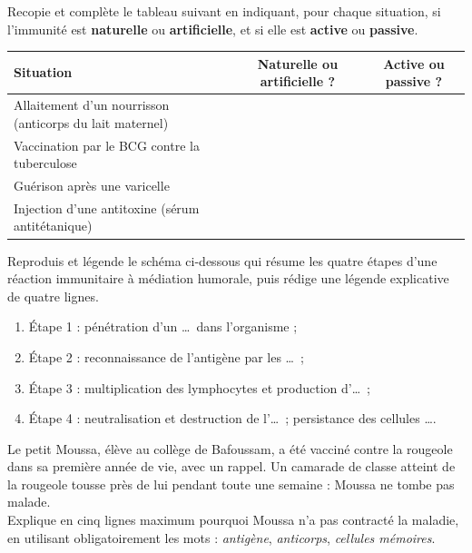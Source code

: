 \documentclass[11pt]{article}
\newcounter{popsec}
\newcounter{popsub}
\newcommand{\courssub}[1]{%
  \stepcounter{popsub}%
  \par\vspace{9pt}\noindent{\popxbold\fontsize{11.5}{13}\selectfont\color{popink}{\color{poporange}\thepopsec.\thepopsub}\hspace{6pt}#1}\par\nopagebreak\vspace{4pt}
}
\begin{document}
\begin{exercice}
Recopie et complète le tableau suivant en indiquant, pour chaque situation, si l'immunité est \textbf{naturelle} ou \textbf{artificielle}, et si elle est \textbf{active} ou \textbf{passive}.
\begin{center}
\begin{tabularx}{\linewidth}{|X|c|c|}
\hline
\rowcolor{popblueL} \textbf{Situation} & \textbf{Naturelle ou artificielle ?} & \textbf{Active ou passive ?} \\
\hline
Allaitement d'un nourrisson (anticorps du lait maternel) & & \\
\hline
Vaccination par le BCG contre la tuberculose & & \\
\hline
Guérison après une varicelle & & \\
\hline
Injection d'une antitoxine (sérum antitétanique) & & \\
\hline
\end{tabularx}
\end{center}
\end{exercice}

\courssub{Je m'entraîne}

\begin{exercice}
Reproduis et légende le schéma ci-dessous qui résume les quatre étapes d'une réaction immunitaire à médiation humorale, puis rédige une légende explicative de quatre lignes.
\begin{enumerate}
\item Étape 1 : pénétration d'un \ldots\ dans l'organisme ;
\item Étape 2 : reconnaissance de l'antigène par les \ldots\ ;
\item Étape 3 : multiplication des lymphocytes et production d'\ldots\ ;
\item Étape 4 : neutralisation et destruction de l'\ldots\ ; persistance des cellules \ldots .
\end{enumerate}
\end{exercice}

\begin{exercice}
Le petit Moussa, élève au collège de Bafoussam, a été vacciné contre la rougeole dans sa première année de vie, avec un rappel. Un camarade de classe atteint de la rougeole tousse près de lui pendant toute une semaine : Moussa ne tombe pas malade.\\
Explique en cinq lignes maximum pourquoi Moussa n'a pas contracté la maladie, en utilisant obligatoirement les mots : \emph{antigène}, \emph{anticorps}, \emph{cellules mémoires}.
\end{exercice}
\end{document}
